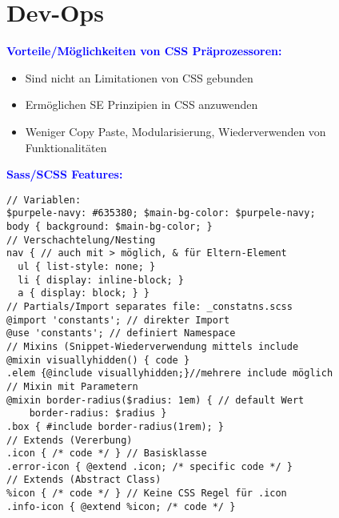 
\section{Dev-Ops}


\textbf{\textcolor{blue}{Vorteile/Möglichkeiten von CSS Präprozessoren:}}
\begin{itemize}[topsep=0pt, leftmargin=3mm]
    \setlength\itemsep{-0.3em}
    \item Sind nicht an Limitationen von CSS gebunden
    \item Ermöglichen SE Prinzipien in CSS anzuwenden
    \item Weniger Copy Paste, Modularisierung, Wiederverwenden von Funktionalitäten
\end{itemize}
\textbf{\textcolor{blue}{Sass/SCSS Features:}}
\begin{lstlisting}[style=htmlcssjs]
// Variablen:
$purpele-navy: #635380; $main-bg-color: $purpele-navy;
body { background: $main-bg-color; }
// Verschachtelung/Nesting
nav { // auch mit > möglich, & für Eltern-Element
  ul { list-style: none; }
  li { display: inline-block; }
  a { display: block; } }
// Partials/Import separates file: _constatns.scss
@import 'constants'; // direkter Import
@use 'constants'; // definiert Namespace
// Mixins (Snippet-Wiederverwendung mittels include
@mixin visuallyhidden() { code }
.elem {@include visuallyhidden;}//mehrere include möglich
// Mixin mit Parametern
@mixin border-radius($radius: 1em) { // default Wert
    border-radius: $radius }
.box { #include border-radius(1rem); }
// Extends (Vererbung)
.icon { /* code */ } // Basisklasse
.error-icon { @extend .icon; /* specific code */ }
// Extends (Abstract Class)
%icon { /* code */ } // Keine CSS Regel für .icon
.info-icon { @extend %icon; /* code */ }
\end{lstlisting}